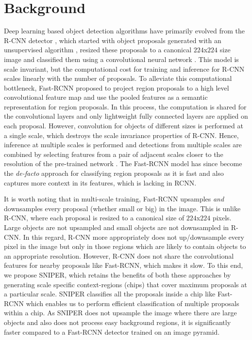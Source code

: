 \documentclass{article}
\begin{document}
\section{Background}
Deep learning based object detection algorithms have primarily evolved from the R-CNN detector \cite{girshick2014rich}, which started with object proposals generated with an unsupervised algorithm \cite{uijlings2013selective}, resized these proposals to a canonical $224$x$224$ size image and classified them using a convolutional neural network \cite{lecun1998gradient}. This model is scale invariant, but the computational cost for training and inference for R-CNN scales linearly with the number of proposals. To alleviate this computational bottleneck, Fast-RCNN \cite{girshick2015fast} proposed to project region proposals to a high level convolutional feature map and use the pooled features as a semantic representation for region proposals. In this process, the computation is shared for the convolutional layers and only lightweight fully connected layers are applied on each proposal. However, convolution for objects of different sizes is performed at a single scale, which destroys the scale invariance properties of R-CNN. Hence, inference at multiple scales is performed and detections from multiple scales are combined by selecting features from a pair of adjacent scales closer to the resolution of the pre-trained network \cite{he2014spatial,girshick2015fast}. The Fast-RCNN model has since become the {\em de-facto} approach for classifying region proposals as it is fast and also captures more context in its features, which is lacking in RCNN. 


It is worth noting that in multi-scale training, Fast-RCNN upsamples {\em and} downsamples every proposal (whether small or big) in the image. This is unlike R-CNN, where each proposal is resized to a canonical size of $224$x$224$ pixels. Large objects are not upsampled and small objects are not downsampled in R-CNN. In this regard, R-CNN more appropriately does not up/downsample every pixel in the image but only in those regions which are likely to contain objects to an appropriate resolution. However, R-CNN does not share the convolutional features for nearby proposals like Fast-RCNN, which makes it slow. To this end, we propose  SNIPER, which retains the benefits of both these approaches by generating scale specific context-regions (chips) that cover maximum proposals at a particular scale. SNIPER classifies all the proposals inside a chip like Fast-RCNN which enables us to perform efficient classification of multiple proposals within a chip. As SNIPER does not upsample the image where there are large objects and also does not process easy background regions, it is significantly faster compared to a Fast-RCNN detector trained on an image pyramid. 
\end{document}
